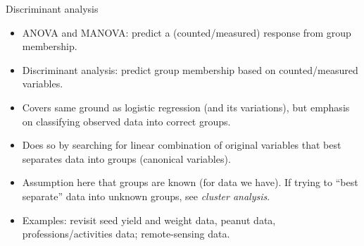 \documentclass[unknownkeysallowed]{beamer}\usepackage[]{graphicx}\usepackage[]{color}
\begin{document}
\begin{frame}[fragile]{Discriminant analysis}

  \begin{itemize}
  \item ANOVA and MANOVA: predict a (counted/measured) response from group membership.
  \item Discriminant analysis: predict group membership based on counted/measured variables.
  \item Covers same ground as logistic regression (and its variations), but emphasis on classifying observed data into correct groups.
  \item Does so by searching for linear combination of original variables that best separates data into groups (canonical variables).
  \item Assumption here that groups are known (for data we have). If trying to ``best separate'' data into unknown groups, see {\em cluster analysis}.
  \item Examples: revisit seed yield and weight data, peanut data,
    professions/activities data; remote-sensing data.
  \end{itemize}

\end{frame}
\end{document}
